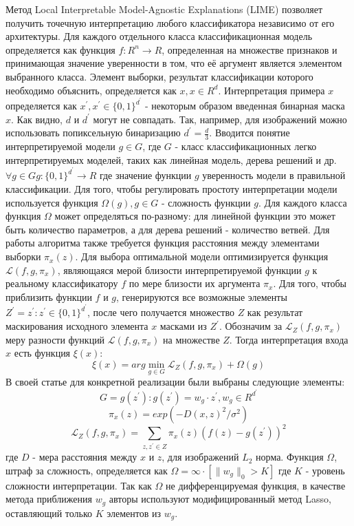 \documentclass[oneside,final,14pt]{extreport}
\begin{document}
Метод Local Interpretable Model-Agnostic Explanations (LIME)\cite{1602.04938}  позволяет получить точечную интерпретацию любого классификатора независимо от его архитектуры. Для каждого отдельного класса классификационная модель определяется как функция $f: R^n \rightarrow R$, определенная на множестве признаков и принимающая значение уверенности в том, что её аргумент является элементом выбранного класса. Элемент выборки, результат классификации которого необходимо объяснить, определяется как $x, x\in R^d$. Интерпретация примера $x$ определяется как $x^\prime, x^\prime \in \{0,1\}^{d^\prime}$ - некоторым образом введенная бинарная маска $x$. Как видно, $d$ и $d^\prime$ могут не совпадать. Так, например, для изображений можно использовать попиксельную бинаризацию $d^\prime = \frac{d}{3}$. Вводится понятие интерпретируемой модели $g\in G$, где $G$ - класс классификационных легко интерпретируемых моделей, таких как линейная модель, дерева решений и др. $\forall g\in G g:  \{0,1\}^{d^\prime} \rightarrow R$ где значение функции $g$ уверенность модели в правильной классификации. Для того, чтобы регулировать простоту интерпретации модели используется функция $\Omega(g), g \in G$ - сложность функции $g$. Для каждого класса функция $\Omega$ может определяться по-разному: для линейной функции это может быть количество параметров, а для дерева решений - количество ветвей. Для работы алгоритма также требуется функция расстояния между элементами выборки $\pi_x(z)$. Для выбора оптимальной модели оптимизируется функция  $\mathcal{L}(f,g,\pi_x)$, являющаяся мерой близости интерпретируемой функции $g$ к реальному классификатору $f$ по мере близости их аргумента $\pi_x$. Для того, чтобы приблизить функции $f$ и $g$, генерируются все возможные элементы $Z^\prime= z^\prime: z^\prime \in \{0,1\}^{d^\prime}$, после чего получается множество $Z$ как результат маскирования исходного элемента $x$ масками из $Z^\prime$. Обозначим за  $\mathcal{L}_Z(f,g,\pi_x)$ меру разности функций $\mathcal{L}(f,g,\pi_x)$ на множестве $Z$. Тогда интерпретация входа $x$ есть функция $\xi(x)$:
$$
\xi(x) = arg\min_{g\in G} \mathcal{L}_Z(f,g,\pi_x) + \Omega(g)
$$
В своей статье \cite{1602.04938} для конкретной реализации были выбраны следующие элементы:
$$
G = g(z^\prime): g(z^\prime)=w_g \cdot z^\prime, w_g \in R^{d^\prime}
$$
$$\pi_x(z) = exp(-D(x,z)^2/\sigma^2)$$
$$\mathcal{L}_Z(f,g,\pi_x) = 
\displaystyle\sum_{z,z^\prime \in Z}{} \pi_x(z)(f(z) - g(z^\prime))^2
$$
где $D$ - мера расстояния между $x$ и $z$, для изображений $L_2$ норма.  Функция $\Omega$, штраф за сложность, определяется как $\Omega = \infty \cdot [\|w_g\|_0 > K]$ где $K$ - уровень сложности интерпретации. Так как $\Omega$ не дифференцируемая функция,  в качестве метода приближения $w_g$ авторы используют модифицированный метод Lasso, оставляющий только $K$ элементов из $w_g$.  
\end{document}
